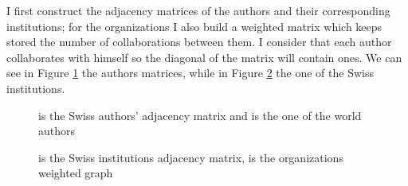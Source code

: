 \documentclass[]{usiinfbachelorproject}
\begin{document}
I first construct the adjacency matrices of the authors and their corresponding institutions; for the organizations I also build a weighted matrix which keeps stored the number of collaborations between them. I consider that each author collaborates with himself so the diagonal of the matrix will contain ones.
We can see in Figure \ref{fig:authorsAdj} the authors matrices, while in Figure \ref{fig:univAdj} the one of the Swiss institutions.

\begin{figure}[tb]
	\centering
	\caption{ is the Swiss authors' adjacency matrix and  is the one of the world authors}
	\label{fig:authorsAdj}
\end{figure}

\begin{figure}[tb]
	\centering
	\caption{  is the Swiss institutions adjacency matrix,  is the organizations weighted graph}
	\label{fig:univAdj}
\end{figure}
\end{document}
